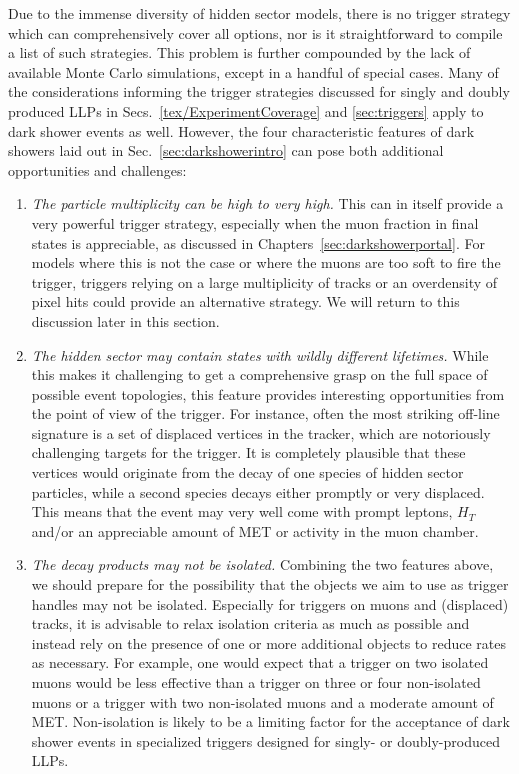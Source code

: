 Due to the immense diversity of hidden sector models, there is no trigger strategy which can comprehensively cover all options, nor is it straightforward to compile a list of such strategies. This problem is further compounded by the lack of available Monte Carlo simulations, except in a handful of special cases. 
Many of the considerations informing the trigger strategies discussed for singly and doubly produced LLPs in Secs.~\ref{tex/ExperimentCoverage} and \ref{sec:triggers}  apply to dark shower events as well.  However, the four characteristic features of dark showers laid out in Sec.~\ref{sec:darkshowerintro} can pose both additional opportunities and challenges:
\begin{enumerate}
\item \emph{The particle multiplicity can be high to very high.} This can in itself provide a very powerful trigger strategy, especially when the muon fraction in final states is appreciable, as discussed in Chapters~\ref{sec:darkshowerportal}. For models where this is not the case or where the muons are too soft to fire the trigger, triggers relying on a large multiplicity of tracks or an overdensity of pixel hits could provide an alternative strategy. We will return to this discussion later in this section.

\item \emph{The hidden sector may contain states with wildly different lifetimes.} While this makes it  challenging to get a comprehensive grasp on the full space of possible event topologies, this feature provides interesting opportunities from the point of view of the trigger. For instance, often the most striking off-line signature is a set of displaced vertices in the tracker, which are notoriously challenging targets for the trigger. It is completely plausible that these vertices would originate from the decay of one species of hidden sector particles, while a second species decays either promptly or very displaced. This means that the event may very well come with prompt leptons, $H_T$ and/or an appreciable amount of MET or activity in the muon chamber.

\item \emph{The decay products may not be isolated.} Combining the two features above, we should prepare for the possibility that the objects we aim to use as trigger handles may not be isolated.  Especially for triggers on muons and (displaced) tracks, it is advisable to relax  isolation criteria as much as possible and instead rely on the presence of one or more additional objects to reduce rates as necessary. For example, one would expect that a trigger on two isolated muons would be less effective than a trigger on three or four non-isolated muons or a trigger with two non-isolated muons and a moderate amount of MET.  Non-isolation is likely to be a limiting factor for the acceptance of dark shower events in specialized triggers designed for singly- or doubly-produced LLPs. 


\end{enumerate}
